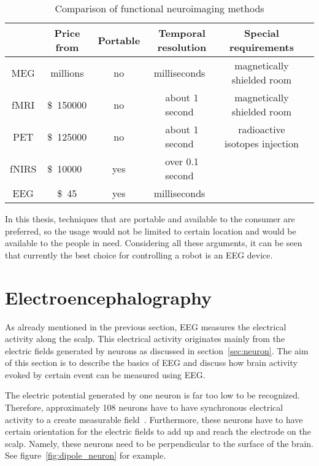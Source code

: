 
\begin{table}[h]
	\centering
	\begin{tabular}{|c|c|c|c|c|c|}\hline
			& Price	from				& Portable	& Temporal resolution		& Special requirements			\\\hline
\gls{MEG}	& millions\pMEG				& no		& milliseconds~\tresol		& magnetically shielded room	\\\hline
\gls{fMRI}	& \SI{150000}[\$]\pfMRI		& no		& about 1 second~\tresol	& magnetically shielded room	\\\hline
\gls{PET}	& \SI{125000}[\$]\pPET		& no		& about 1 second~\tresol	& radioactive isotopes injection\\\hline
\gls{fNIRS}	& \SI{10000}[\$]{}~\pNIRS	& yes		& over 0.1 second~\pNIRS	&								\\\hline
\gls{EEG}	& \SI{45}[\$]\pEEG			& yes		& milliseconds~\tresol		&								\\\hline
	\end{tabular}
	\caption{Comparison of functional neuroimaging methods}
	\label{tab:neuroimaging}
\end{table}

In this thesis, techniques that are portable and available to the consumer are preferred, so the usage would not be limited to certain location and would be available to the people in need. Considering all these arguments, it can be seen that currently the best choice for controlling a robot is an \gls{EEG} device.

\section{Electroencephalography}
\label{sec:EEG}

As already mentioned in the previous section, \gls{EEG} measures the electrical activity along the scalp. This electrical activity originates mainly from the electric fields generated by \glspl{neuron} as discussed in section~\ref{sec:neuron}. The aim of this section is to describe the basics of \gls{EEG} and discuss how brain activity evoked by certain event can be measured using \gls{EEG}.

The electric potential generated by one \gls{neuron} is far too low to be recognized. Therefore, approximately 108 \glspl{neuron} have to have synchronous electrical activity to a create measurable field~\cite{field_count}. Furthermore, these \glspl{neuron} have to have certain orientation for the electric fields to add up and reach the electrode on the scalp. Namely, these neurons need to be perpendicular to the surface of the brain. See figure~\ref{fig:dipole_neuron} for example.


